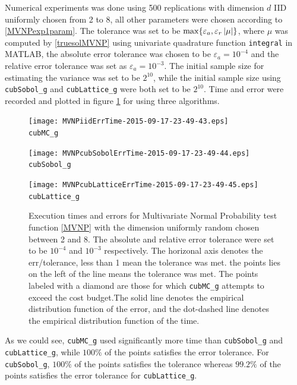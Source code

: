 \documentclass{iitthesis}
\begin{document}
Numerical experiments was done using 500 replications with dimension $d$ IID uniformly chosen from 2 to 8, all other parameters were chosen according to \eqref{MVNPexp1param}. The tolerance was set to be $\max\{\varepsilon_a,\varepsilon_r \left \lvert \mu \right \rvert\}$, where $\mu$ was computed by \eqref{truesolMVNP} using univariate quadrature function {\tt integral} in MATLAB, the absolute error tolerance was chosen to be $\varepsilon_a = 10^{-4}$ and the relative error tolerance was set as $\varepsilon_a = 10^{-3}$. The initial sample size for estimating the variance was set to be $2^10$, while the initial sample size using {\tt cubSobol\_g} and {\tt cubLattice\_g} were both set to be $2^10$. Time and error were recorded and plotted in figure \ref{fig:MVNPTestFun1} for using three algorithms.
\begin{figure}
\centering
\begin{minipage}{9cm} \centering \texttt{[image: MVNPiidErrTime-2015-09-17-23-49-43.eps]} \\ {\tt cubMC\_g}  \end{minipage}
\begin{minipage}{7cm} \centering \texttt{[image: MVNPcubSobolErrTime-2015-09-17-23-49-44.eps]} \\  {\tt cubSobol\_g}\end{minipage}
\begin{minipage}{7cm} \centering \texttt{[image: MVNPcubLatticeErrTime-2015-09-17-23-49-45.eps]} \\ {\tt cubLattice\_g} \end{minipage}
\caption{Execution times and errors for Multivariate Normal Probability test function \eqref{MVNP} with the dimension uniformly random chosen between 2 and 8. The absolute and relative error tolerance were set to be $10^{-4}$ and $10^{-3}$ respectively. The horizonal axis denotes the err/tolerance, less than 1 mean the tolerance was met. the points lies on the left of the line means the tolerance was met. The points labeled with a diamond are those for which  {\tt cubMC\_g}  attempts to exceed the cost budget.The solid line denotes the empirical distribution function of the error, and the dot-dashed line denotes the empirical distribution function of the time.\label{fig:MVNPTestFun1} }
\end{figure}
As we could see, {\tt cubMC\_g} used significantly more time than {\tt cubSobol\_g} and {\tt cubLattice\_g}, while $100\%$ of the points satisfies the error tolerance. For {\tt cubSobol\_g}, $100\%$ of the points satisfies the tolerance whereas $99.2\%$ of the points satisfies the error tolerance for {\tt cubLattice\_g}.
\end{document}
